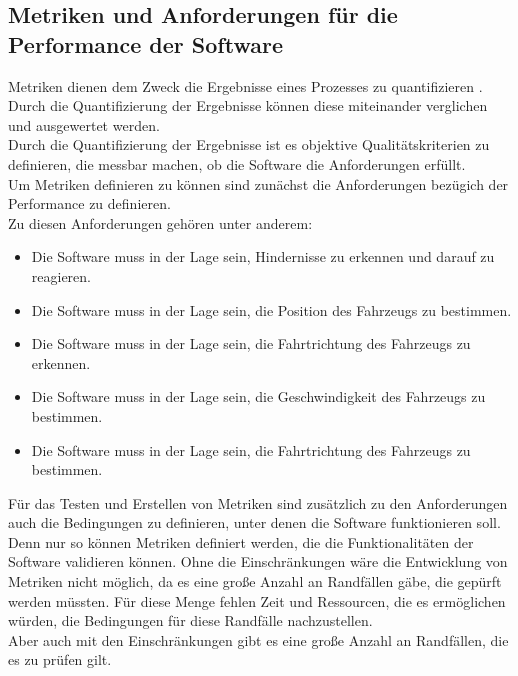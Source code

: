 \subsection{Metriken und Anforderungen für die Performance der Software}
Metriken dienen dem Zweck die Ergebnisse eines Prozesses zu quantifizieren \cite[S. 204]{nirpal2011brief}. Durch die Quantifizierung der Ergebnisse können diese miteinander verglichen und ausgewertet werden. \\
Durch die Quantifizierung der Ergebnisse ist es objektive Qualitätskriterien zu definieren, die messbar machen, ob die Software die Anforderungen erfüllt. \\
Um Metriken definieren zu können sind zunächst die Anforderungen bezügich der Performance zu definieren. \\
Zu diesen Anforderungen gehören unter anderem:\\
\begin{itemize}
    \item Die Software muss in der Lage sein, Hindernisse zu erkennen und darauf zu reagieren.
    \item Die Software muss in der Lage sein, die Position des Fahrzeugs zu bestimmen.
    \item Die Software muss in der Lage sein, die Fahrtrichtung des Fahrzeugs zu erkennen.
    \item Die Software muss in der Lage sein, die Geschwindigkeit des Fahrzeugs zu bestimmen.
    \item Die Software muss in der Lage sein, die Fahrtrichtung des Fahrzeugs zu bestimmen.
\end{itemize}
Für das Testen und Erstellen von Metriken sind zusätzlich zu den Anforderungen auch die Bedingungen zu definieren, unter denen die Software funktionieren soll.\\
Denn nur so können Metriken definiert werden, die die Funktionalitäten der Software validieren können. Ohne die Einschränkungen wäre die Entwicklung von Metriken nicht möglich, da es eine große Anzahl an Randfällen gäbe, 
die gepürft werden müssten. Für diese Menge fehlen Zeit und Ressourcen, die es ermöglichen würden, die Bedingungen für diese Randfälle nachzustellen. \\
Aber auch mit den Einschränkungen gibt es eine große Anzahl an Randfällen, die es zu prüfen gilt. \\
